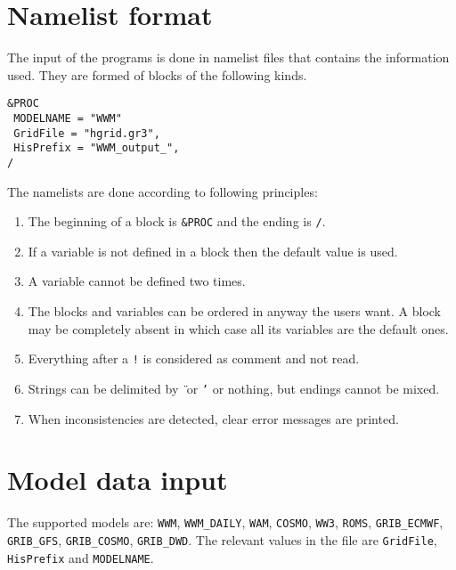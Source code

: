 \documentclass[12pt]{amsart}
\begin{document}
\section{Namelist format}

The input of the programs is done in namelist files that contains the information used.
They are formed of blocks of the following kinds.

\begin{verbatim}
&PROC
 MODELNAME = "WWM"
 GridFile = "hgrid.gr3",
 HisPrefix = "WWM_output_",
/
\end{verbatim}

The namelists are done according to following principles:
\begin{enumerate}
\item The beginning of a block is {\tt \&PROC} and the ending is {\tt /}.
\item If a variable is not defined in a block then the default value is used.
\item A variable cannot be defined two times.
\item The blocks and variables can be ordered in anyway the users want. A block may be completely absent in which case all its variables are the default ones.
\item Everything after a {\tt !} is considered as comment and not read.
\item Strings can be delimited by {\tt {\"{ }}} or {\tt '} or nothing, but endings cannot be mixed.
\item When inconsistencies are detected, clear error messages are printed.
\end{enumerate}









\section{Model data input}

The supported models are: {\tt WWM}, {\tt WWM\_DAILY}, {\tt WAM}, {\tt COSMO}, {\tt WW3}, {\tt ROMS}, {\tt GRIB\_ECMWF}, {\tt GRIB\_GFS}, {\tt GRIB\_COSMO}, {\tt GRIB\_DWD}.
The relevant values in the file are {\tt GridFile}, {\tt HisPrefix} and {\tt MODELNAME}.
\end{document}
